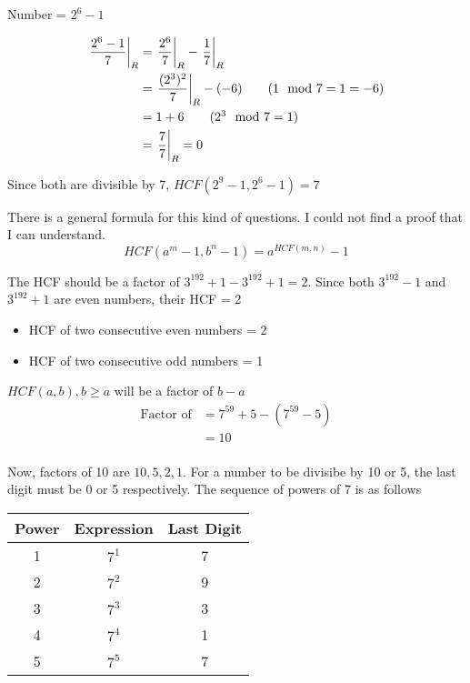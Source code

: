 Number = $2^6 - 1$ 

\begin{align*}
    \displaystyle{ \left. \frac{2^6 - 1}{7} \right |_{R} } &= \displaystyle{ \left. \frac{2^6}{7} \right |_{R} } - \displaystyle{ \left. \frac{1}{7} \right |_{R} } \\
    &= \displaystyle{ \left. \frac{(2^3)^2}{7} \right |_{R} } - (-6) \tag{$1 \mod 7 = 1 = -6$} \\
    &= 1 + 6 \tag{$2^3 \mod 7 = 1$} \\
    &= \displaystyle{ \left. \frac{7}{7} \right |_{R} } = 0
\end{align*}

Since both are divisible by 7, $HCF(2^9 - 1, 2^6 - 1) = 7$

\begin{NOTE}
    There is a general formula for this kind of questions. I could not find a proof that I can understand. 
    $$HCF(a^m - 1, b^n - 1) = a^{HCF(m,n)} - 1$$
\end{NOTE}


The HCF should be a factor of $3^{192} + 1 - 3^{192} + 1 = 2$. Since both $3^{192} - 1$ and $3^{192} + 1$ are even numbers, their HCF = 2

\begin{EXTRA-LEARNING}
    \begin{itemize}
        \item HCF of two consecutive even numbers = 2
        \item HCF of two consecutive odd numbers = 1
    \end{itemize}
\end{EXTRA-LEARNING}

$HCF(a,b), b \geq a$ will be a factor of $b-a$
\begin{align*}
    \text{Factor of} &= 7^{59} + 5 - (7^{59} - 5) \\
    &= 10 \\
\end{align*}

Now, factors of 10 are $10,5,2,1$. For a number to be divisibe by 10 or 5, the last digit must be 0 or 5 respectively. The sequence of powers of 7 is as follows

\begin{table}[h!]
    \centering
    \begin{tabular}{|| c | c | c ||}
         \hline
         Power & Expression & Last Digit  \\
         \hline
         1 & $7^1$ & 7 \\ 
         \hline
         2 & $7^2$ & 9 \\ 
         \hline
         3 & $7^3$ & 3 \\ 
         \hline
         4 & $7^4$ & 1 \\ 
         \hline
         5 & $7^5$ & 7 \\ 
         \hline
    \end{tabular}
\end{table}

